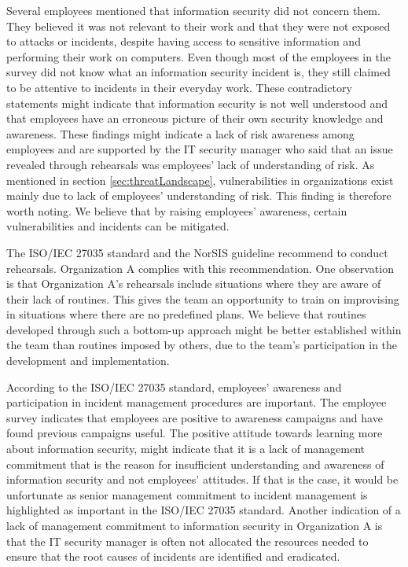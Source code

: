 Several employees mentioned that information security did not concern them. They believed it was not relevant to their work and that they were not exposed to attacks or incidents, despite having access to sensitive information and performing their work on computers. Even though most of the employees in the survey did not know what an information security incident is, they still claimed to be attentive to incidents in their everyday work. These contradictory statements might indicate that information security is not well understood and that employees have an erroneous picture of their own security knowledge and awareness. These findings might indicate a lack of risk awareness among employees and are supported by the IT security manager who said that an issue revealed through rehearsals was employees' lack of understanding of risk. As mentioned in section \ref{sec:threatLandscape}, vulnerabilities in organizations exist mainly due to lack of employees' understanding of risk. This finding is therefore worth noting. We believe that by raising employees' awareness, certain vulnerabilities and incidents can be mitigated.

The ISO/IEC 27035 standard and the NorSIS guideline recommend to conduct rehearsals. Organization A complies with this recommendation. One observation is that Organization A's rehearsals include situations where they are aware of their lack of routines. This gives the team an opportunity to train on improvising in situations where there are no predefined plans. We believe that routines developed through such a bottom-up approach might be better established within the team than routines imposed by others, due to the team's participation in the development and implementation.

According to the ISO/IEC 27035 standard, employees' awareness and participation in incident management procedures are important. The employee survey indicates that employees are positive to awareness campaigns and have found previous campaigns useful. The positive attitude towards learning more about information security, might indicate that it is a lack of management commitment that is the reason for insufficient understanding and awareness of information security and not employees' attitudes. If that is the case, it would be unfortunate as senior management commitment to incident management is highlighted as important in the ISO/IEC 27035 standard. Another indication of a lack of management commitment to information security in Organization A is that the IT security manager is often not allocated the resources needed to ensure that the root causes of incidents are identified and eradicated. 

